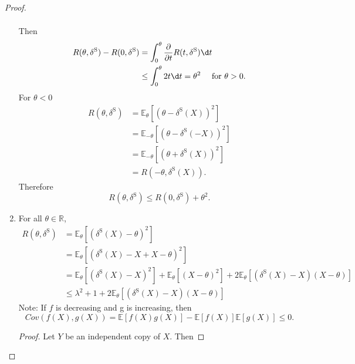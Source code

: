 \documentclass[a4paper]{article}
\begin{document}
\begin{proof}
\begin{enumerate}
\begin{equation*}
\begin{aligned}
			\end{aligned}
		\end{equation*}
		Then
		\begin{equation}
			\begin{aligned}
				R(\theta,\delta^{\text{S}}) - R(0,\delta^{\text{S}}) &= \int_0^{\theta} \frac{\partial}{\partial t} R(t,\delta^{\text{S}}) \d t \\
				&\leq \int_0^{\theta} 2t \d t = \theta^2 \quad \text{ for } \theta > 0.
			\end{aligned}
		\end{equation}
		For $\theta < 0$
		\begin{equation}
			\begin{aligned}
				R(\theta, \delta^{\text{S}}) &= \mathbb{E}_\theta[(\theta - \delta^{\text{S}}(X))^2] \\ 
				&= \mathbb{E}_{-\theta}[(\theta - \delta^{\text{S}}(-X))^2] \\
				&= \mathbb{E}_{-\theta}[(\theta + \delta^{\text{S}}(X))^2] \\
				&= R(-\theta,\delta^{\text{S}}(X)).
			\end{aligned}
		\end{equation}
		Therefore
		\begin{equation}
			R(\theta,\delta^{\text{S}}) \leq R(0,\delta^{\text{S}}) + \theta^2.
		\end{equation}
		\item For all $\theta \in \mathbb{R}$,
		\begin{equation*}
			\begin{aligned}
				R(\theta, \delta^{\text{S}}) &= \mathbb{E}_\theta[(\delta^{\text{S}}(X) - \theta)^2] \\ 
				&= \mathbb{E}_\theta[(\delta^{\text{S}}(X) - X + X - \theta)^2] \\ 
				&= \mathbb{E}_\theta[(\delta^{\text{S}}(X) - X)^2] + \mathbb{E}_\theta[(X - \theta)^2] + 2 \mathbb{E}_\theta[(\delta^{\text{S}}(X) - X)(X - \theta)] \\
				&\leq  \lambda^2 + 1 + 2 \mathbb{E}_\theta[(\delta^{\text{S}}(X) - X)(X - \theta)]
			\end{aligned}
		\end{equation*}
		Note: If $f$ is decreasing and g is increasing, then
		\begin{equation*}
			Cov(f(X),g(X)) = \mathbb{E}[f(X)g(X)] - \mathbb{E}[f(X)]\mathbb{E}[g(X)] \leq 0.
		\end{equation*}
		\begin{proof}
			Let $Y$ be an independent copy of $X$. Then

\end{proof}
\end{enumerate}
\end{proof}
\end{document}
